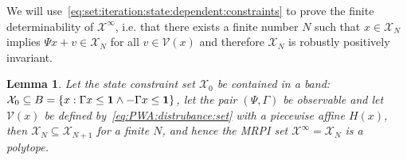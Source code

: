 \documentclass[letterpaper, 10pt, conference]{ieeeconf} %
\newtheorem{thm}{Lemma}[section]
\begin{document}
%
We will use~\eqref{eq:set:iteration:state:dependent:constraints} to prove the finite determinability of
$\mathcal X^\infty$, i.e. that there exists a finite number $N$ such that $x\in\mathcal X_N$ implies
$\Psi x + v \in\mathcal X_N$ for all $v\in\mathcal V(x)$ and therefore $\mathcal X_N$ is robustly positively invariant.
%
\begin{thm}\label{thm:finite:MRPI:set:state:dependable}
Let the state constraint set $\mathcal X_0$ be contained in a band: $\mathcal X_0\subseteq B=\{x:\Gamma x\leq{\bf{1}}\wedge 
-\Gamma x\leq{\bf{1}}\}$, let the pair $(\Psi,\Gamma)$ be observable and let $\mathcal V(x)$ be defined by~\eqref{eq:PWA:distrubance:set}
with a piecewise affine $H(x)$, 
then $\mathcal X_N\subseteq \mathcal X_{N+1}$ for a finite $N$, and hence the MRPI set $\mathcal X^\infty 
=\mathcal X_N$ is a polytope.
\end{thm}
%
\end{document}
